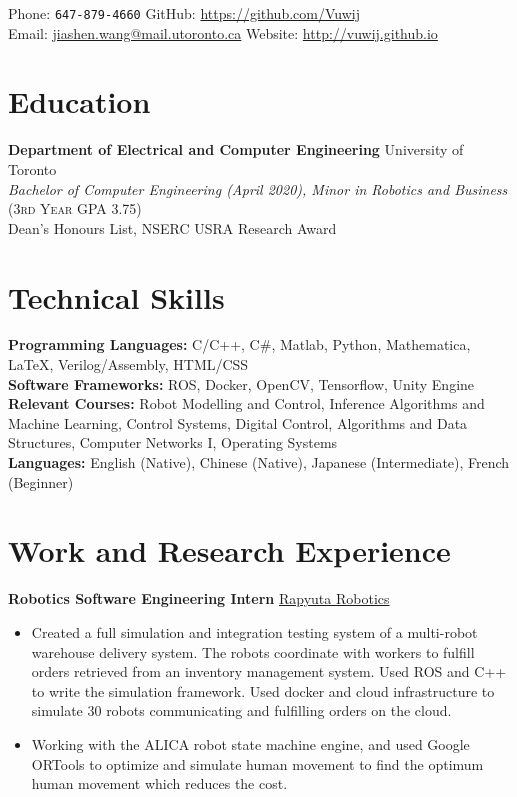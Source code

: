 \documentclass[10pt, a4paper]{cv}
\renewcommand*{\name}{\fontsize{24}{40}\mdseries\upshape}
\begin{document}
\begin{center}
\name{Jason Wang}
\end{center}

Phone: \texttt{647-879-4660} \hfill
GitHub: \href{https://github.com/Vuwij}{https://github.com/Vuwij}\\
Email: \href{mailto:jiashen.wang@mail.utoronto.ca}{jiashen.wang@mail.utoronto.ca}\hfill
Website: \href{http://vuwij.github.io}{http://vuwij.github.io}

\section*{Education}
\textbf{Department of Electrical and Computer Engineering} \hfill University of Toronto\\
\emph{Bachelor of Computer Engineering (April 2020), Minor in Robotics and Business} \small{\textsc{(3rd Year GPA 3.75)}}\\[0.1mm]
\small Dean's Honours List, NSERC USRA Research Award

\section*{Technical Skills}
\textbf{Programming Languages:} C/C++, C\#, Matlab, Python, Mathematica, \LaTeX, Verilog/Assembly, HTML/CSS\\[0.2em]
\textbf{Software Frameworks:} ROS, Docker, OpenCV, Tensorflow, Unity Engine\\[0.2em]
\textbf{Relevant Courses:} Robot Modelling and Control, Inference Algorithms and Machine Learning, Control Systems, Digital Control, Algorithms and Data Structures, Computer Networks I, Operating Systems \\
\textbf{Languages:} English (Native), Chinese (Native), Japanese (Intermediate), French (Beginner)
\section*{Work and Research Experience}\noindent
	\textbf{Robotics Software Engineering Intern} \hfill \href{https://www.rapyuta-robotics.com}{Rapyuta Robotics}
	\begin{itemize}
		\item Created a full simulation and integration testing system of a multi-robot warehouse delivery system. The robots coordinate with workers to fulfill orders retrieved from an inventory management system. Used ROS and C++ to write the simulation framework. Used docker and cloud infrastructure to simulate 30 robots communicating and fulfilling orders on the cloud.
		\item Working with the ALICA robot state machine engine, and used Google ORTools to optimize and simulate human movement to find the optimum human movement which reduces the cost.
	\end{itemize}
\end{document}
